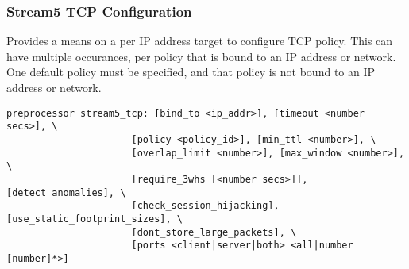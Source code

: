 \documentclass[english]{report}
\begin{document}
\subsubsection{Stream5 TCP Configuration}

Provides a means on a per IP address target to configure TCP policy.
This can have multiple occurances, per policy that is bound to an IP
address or network.  One default policy must be specified, and that policy
is not bound to an IP address or network.

\begin{verbatim}
preprocessor stream5_tcp: [bind_to <ip_addr>], [timeout <number secs>], \
                      [policy <policy_id>], [min_ttl <number>], \
                      [overlap_limit <number>], [max_window <number>], \
                      [require_3whs [<number secs>]], [detect_anomalies], \
                      [check_session_hijacking], [use_static_footprint_sizes], \
                      [dont_store_large_packets], \
                      [ports <client|server|both> <all|number [number]*>]
\end{verbatim}
\end{document}
